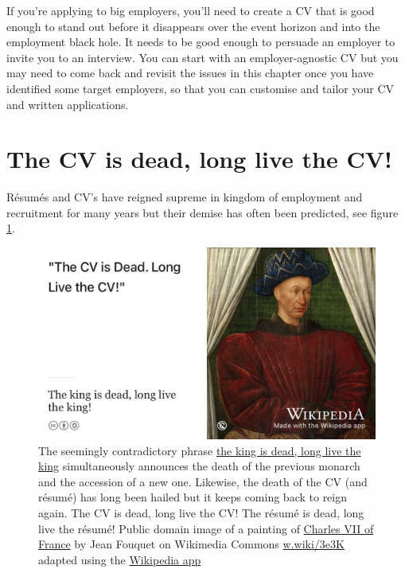 \documentclass[
]{book}
\begin{document}
If you're applying to big employers, you'll need to create a CV that is good enough to stand out before it disappears over the event horizon and into the employment black hole. It needs to be good enough to persuade an employer to invite you to an interview. You can start with an employer-agnostic CV but you may need to come back and revisit the issues in this chapter once you have identified some target employers, so that you can customise and tailor your CV and written applications.

\hypertarget{dead}{%
\section{The CV is dead, long live the CV!}\label{dead}}

Résumés and CV's have reigned supreme in kingdom of employment and recruitment for many years but their demise has often been predicted, see figure \ref{fig:longlive-fig}.

\begin{figure}

{\centering \includegraphics[width=0.99\linewidth]{images/the-king-is-dead} 

}

\caption{The seemingly contradictory phrase \href{https://en.wikipedia.org/wiki/The_king_is_dead,_long_live_the_king!}{the king is dead, long live the king} simultaneously announces the death of the previous monarch and the accession of a new one. Likewise, the death of the CV (and résumé) has long been hailed but it keeps coming back to reign again. The CV is dead, long live the CV! The résumé is dead, long live the résumé! Public domain image of a painting of \href{https://en.wikipedia.org/wiki/Charles_VII_of_France}{Charles VII of France} by Jean Fouquet on Wikimedia Commons \href{https://w.wiki/3e3K}{w.wiki/3e3K} adapted using the \href{https://apps.apple.com/us/app/wikipedia/id324715238}{Wikipedia app}}\label{fig:longlive-fig}
\end{figure}
\end{document}
